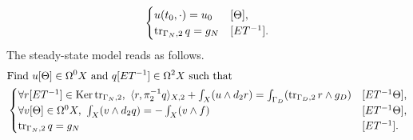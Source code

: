 \begin{discussion}
\begin{equation}
\begin{split}
\begin{cases}
        u(t_0, \cdot) = u_0
        & [\Theta], \\
        \mathop{\rm tr}\nolimits_{\Gamma_N, 2} q = g_N
        & [E T^{-1}].
      \end{cases}
    \end{split}
  \end{equation}
  The steady-state model reads as follows.
  \begin{equation}
    \begin{split}
      & \text{Find $u [\Theta] \in \Omega^0 X$ and
        $q [E T^{-1}] \in \Omega^2 X$ such that} \\
      &
      \begin{cases}
        \forall r [E T^{-1}] \in \mathop{\rm Ker}\nolimits \mathop{\rm tr}\nolimits_{\Gamma_N, 2},\
          \langle r,\pi_2^{-1} q\rangle_{X, 2} + \int_{X} (u \wedge d_2 r)
          = \int_{\Gamma_D} (\mathop{\rm tr}\nolimits_{\Gamma_D, 2} r \wedge g_D)
        & [E T^{-1} \Theta], \\
        \forall v [\Theta] \in \Omega^0 X,\
          \int_X (v \wedge d_2 q) = - \int_X (v \wedge f)
        & [E T^{-1} \Theta], \\
        \mathop{\rm tr}\nolimits_{\Gamma_N, 2} q = g_N
        & [E T^{-1}].
      \end{cases}
    \end{split}
  \end{equation}
\end{discussion}

